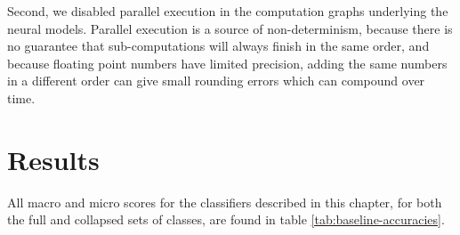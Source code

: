 Second, we disabled parallel execution in the computation graphs underlying
the neural models. Parallel execution is a source of non-determinism, because
there is no guarantee that sub-computations will always finish in the same order,
and because floating point numbers have limited precision, adding the same
numbers in a different order can give small rounding errors which can compound
over time.


\section{Results}

All macro and micro \FI scores for the classifiers described in this chapter,
for both the full and collapsed sets of classes, are found in table
\ref{tab:baseline-accuracies}.

